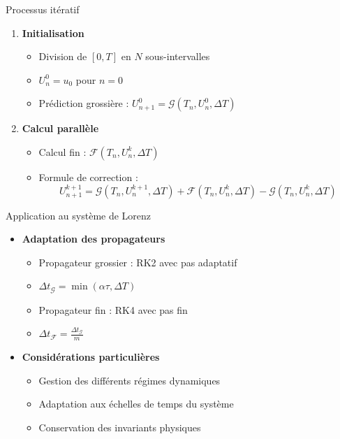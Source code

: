 \begin{frame}{Processus itératif}
    \begin{enumerate}
        \item \textbf{Initialisation}
        \begin{itemize}
            \item Division de $[0,T]$ en $N$ sous-intervalles
            \item $U_n^0 = u_0$ pour $n = 0$
            \item Prédiction grossière : $U_{n+1}^0 = \mathcal{G}(T_n, U_n^0, \Delta T)$
        \end{itemize}
        \vspace{0.2cm}
        \item \textbf{Calcul parallèle}
        \begin{itemize}
            \item Calcul fin : $\mathcal{F}(T_n, U_n^k, \Delta T)$
            \item Formule de correction :
            \begin{equation*}
                U_{n+1}^{k+1} = \mathcal{G}(T_n, U_n^{k+1}, \Delta T) + \mathcal{F}(T_n, U_n^k, \Delta T) - \mathcal{G}(T_n, U_n^k, \Delta T)
            \end{equation*}
        \end{itemize}
    \end{enumerate}
\end{frame}

\begin{frame}{Application au système de Lorenz}
    \begin{itemize}
        \item \textbf{Adaptation des propagateurs}
        \begin{itemize}
            \item Propagateur grossier : RK2 avec pas adaptatif
            \item $\Delta t_{\mathcal{G}} = \min(\alpha\tau, \Delta T)$
            \item Propagateur fin : RK4 avec pas fin
            \item $\Delta t_{\mathcal{F}} = \frac{\Delta t_{\mathcal{G}}}{m}$
        \end{itemize}
        \vspace{0.3cm}
        \item \textbf{Considérations particulières}
        \begin{itemize}
            \item Gestion des différents régimes dynamiques
            \item Adaptation aux échelles de temps du système
            \item Conservation des invariants physiques
        \end{itemize}
    \end{itemize}
\end{frame}

